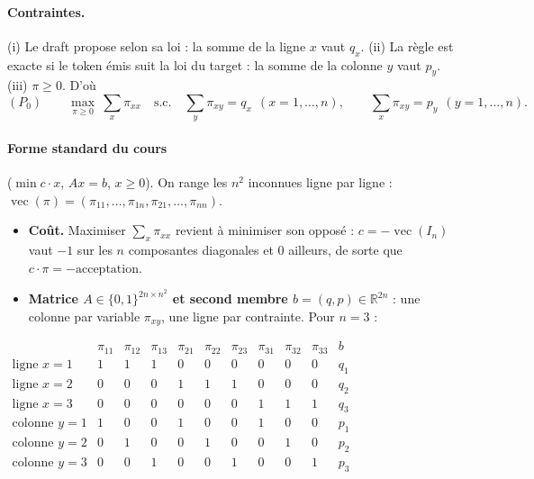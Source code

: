 \documentclass[11pt,a4paper]{article}
\newcommand{\R}{\mathbb{R}}
\newcommand{\vecop}{\operatorname{vec}}
\theoremstyle{plain}
\theoremstyle{definition}
\begin{document}
\paragraph{Contraintes.} (i) Le draft propose selon sa loi : la somme de la ligne $x$ vaut $q_x$. (ii) La règle est exacte si le token émis suit la loi du target : la somme de la colonne $y$ vaut $p_y$. (iii) $\pi\ge0$. D'où
\[(P_0)\qquad \max_{\pi\ge0}\ \sum_x\pi_{xx}\quad\text{s.c.}\quad \sum_y\pi_{xy}=q_x\ \ (x=1,\dots,n),\qquad \sum_x\pi_{xy}=p_y\ \ (y=1,\dots,n).\]

\paragraph{Forme standard du cours} ($\min c\cdot x$, $Ax=b$, $x\ge0$). On range les $n^2$ inconnues ligne par ligne : $\vecop(\pi)=(\pi_{11},\dots,\pi_{1n},\pi_{21},\dots,\pi_{nn})$.
\begin{itemize}
\item \textbf{Coût.} Maximiser $\sum_x\pi_{xx}$ revient à minimiser son opposé : $c=-\vecop(I_n)$ vaut $-1$ sur les $n$ composantes diagonales et $0$ ailleurs, de sorte que $c\cdot\pi=-\text{acceptation}$.
\item \textbf{Matrice $A\in\{0,1\}^{2n\times n^2}$ et second membre $b=(q,p)\in\R^{2n}$} : une colonne par variable $\pi_{xy}$, une ligne par contrainte. Pour $n=3$ :
\end{itemize}
\begin{center}\small
$\begin{array}{r|ccc|ccc|ccc|c}
 & \pi_{11} & \pi_{12} & \pi_{13} & \pi_{21} & \pi_{22} & \pi_{23} & \pi_{31} & \pi_{32} & \pi_{33} & b\\\hline
\text{ligne }x=1 & 1 & 1 & 1 & 0 & 0 & 0 & 0 & 0 & 0 & q_1\\
\text{ligne }x=2 & 0 & 0 & 0 & 1 & 1 & 1 & 0 & 0 & 0 & q_2\\
\text{ligne }x=3 & 0 & 0 & 0 & 0 & 0 & 0 & 1 & 1 & 1 & q_3\\\hline
\text{colonne }y=1 & 1 & 0 & 0 & 1 & 0 & 0 & 1 & 0 & 0 & p_1\\
\text{colonne }y=2 & 0 & 1 & 0 & 0 & 1 & 0 & 0 & 1 & 0 & p_2\\
\text{colonne }y=3 & 0 & 0 & 1 & 0 & 0 & 1 & 0 & 0 & 1 & p_3
\end{array}$
\end{center}
\end{document}
